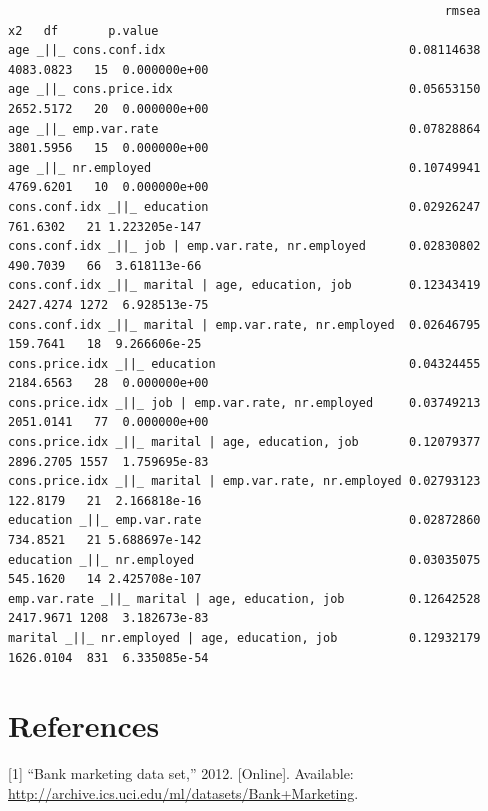 \documentclass[11pt,]{article}
\begin{document}
\label{sec:final_test_results}
{\tiny\begin{verbatim}
                                                             rmsea        x2   df       p.value
age _||_ cons.conf.idx                                  0.08114638 4083.0823   15  0.000000e+00
age _||_ cons.price.idx                                 0.05653150 2652.5172   20  0.000000e+00
age _||_ emp.var.rate                                   0.07828864 3801.5956   15  0.000000e+00
age _||_ nr.employed                                    0.10749941 4769.6201   10  0.000000e+00
cons.conf.idx _||_ education                            0.02926247  761.6302   21 1.223205e-147
cons.conf.idx _||_ job | emp.var.rate, nr.employed      0.02830802  490.7039   66  3.618113e-66
cons.conf.idx _||_ marital | age, education, job        0.12343419 2427.4274 1272  6.928513e-75
cons.conf.idx _||_ marital | emp.var.rate, nr.employed  0.02646795  159.7641   18  9.266606e-25
cons.price.idx _||_ education                           0.04324455 2184.6563   28  0.000000e+00
cons.price.idx _||_ job | emp.var.rate, nr.employed     0.03749213 2051.0141   77  0.000000e+00
cons.price.idx _||_ marital | age, education, job       0.12079377 2896.2705 1557  1.759695e-83
cons.price.idx _||_ marital | emp.var.rate, nr.employed 0.02793123  122.8179   21  2.166818e-16
education _||_ emp.var.rate                             0.02872860  734.8521   21 5.688697e-142
education _||_ nr.employed                              0.03035075  545.1620   14 2.425708e-107
emp.var.rate _||_ marital | age, education, job         0.12642528 2417.9671 1208  3.182673e-83
marital _||_ nr.employed | age, education, job          0.12932179 1626.0104  831  6.335085e-54
\end{verbatim}}

\hypertarget{references}{%
\section*{References}\label{references}}

\hypertarget{refs}{}
\leavevmode\hypertarget{ref-dataset}{}%
{[}1{]} ``Bank marketing data set,'' 2012. {[}Online{]}. Available:
\url{http://archive.ics.uci.edu/ml/datasets/Bank+Marketing}.
\end{document}
